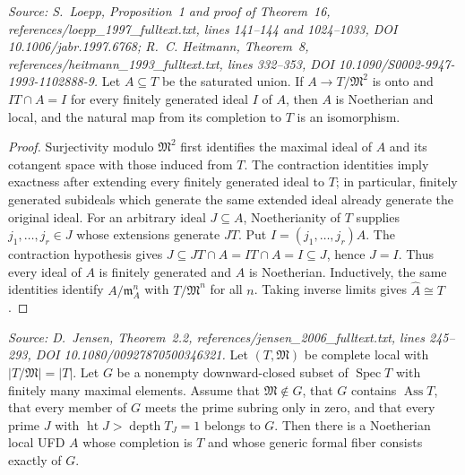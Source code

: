 \begin{lemma}
  \label{lem:jensen_completion_criterion}
  \textit{Source: S.~Loepp, Proposition~1 and proof of Theorem~16,
  references/loepp\_1997\_fulltext.txt, lines 141--144 and 1024--1033,
  DOI 10.1006/jabr.1997.6768; R.~C. Heitmann, Theorem~8,
  references/heitmann\_1993\_fulltext.txt, lines 332--353,
  DOI 10.1090/S0002-9947-1993-1102888-9.}
  Let \(A\subseteq T\) be the saturated union.  If
  \(A\to T/\mathfrak M^2\) is onto and \(IT\cap A=I\) for every finitely
  generated ideal \(I\) of \(A\), then \(A\) is Noetherian and local, and the
  natural map from its completion to \(T\) is an isomorphism.
\end{lemma}

\begin{proof}
  Surjectivity modulo \(\mathfrak M^2\) first identifies the maximal ideal of
  \(A\) and its cotangent space with those induced from \(T\).  The contraction
  identities imply exactness after extending every finitely generated ideal
  to \(T\); in particular, finitely generated subideals which generate the
  same extended ideal already generate the original ideal.  For an arbitrary
  ideal \(J\subseteq A\), Noetherianity of \(T\) supplies
  \(j_1,\ldots,j_r\in J\) whose extensions generate \(JT\).  Put
  \(I=(j_1,\ldots,j_r)A\).  The contraction hypothesis gives
  \(J\subseteq JT\cap A=IT\cap A=I\subseteq J\), hence \(J=I\).  Thus every
  ideal of \(A\) is finitely generated and \(A\) is Noetherian.
  Inductively, the same identities identify
  \(A/\mathfrak m_A^n\) with \(T/\mathfrak M^n\) for all \(n\).  Taking inverse
  limits gives \(\widehat A\cong T\).
\end{proof}

\begin{theorem}
  \label{thm:jensen_semilocal_generic_fiber}
  \textit{Source: D.~Jensen, Theorem~2.2,
  references/jensen\_2006\_fulltext.txt, lines 245--293,
  DOI 10.1080/00927870500346321.}
  Let \((T,\mathfrak M)\) be complete local with
  \(|T/\mathfrak M|=|T|\).  Let \(G\) be a nonempty downward-closed subset of
  \(\operatorname{Spec}T\) with finitely many maximal elements.  Assume that
  \(\mathfrak M\notin G\), that \(G\) contains \(\operatorname{Ass}T\), that
  every member of \(G\) meets the prime subring only in zero, and that every
  prime \(J\) with
  \(\operatorname{ht}J>\operatorname{depth}T_J=1\) belongs to \(G\).
  Then there is a Noetherian local UFD \(A\) whose completion is \(T\) and
  whose generic formal fiber consists exactly of \(G\).
\end{theorem}

